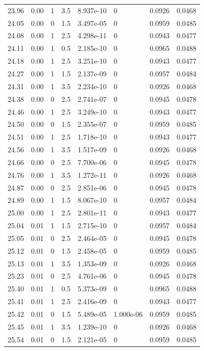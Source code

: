 \documentclass[preview]{standalone}
\begin{document}
{{{{{{{{{{{\begin{tabular}{L{1.2cm}C{1.2cm} C{0.3cm}C{0.5cm} C{1.4cm}C{1.4cm} C{1.4cm}C{1.4cm}}
  23.96  &  0.00  & 1     & 3.5 &  8.937e-10  & 0  & 0.0926 &  0.0468   \\ 
  24.05  &  0.00  & 0     & 1.5 &  3.497e-05  & 0  & 0.0959 &  0.0485   \\ 
  24.08  &  0.00  & 1     & 2.5 &  4.298e-11  & 0  & 0.0943 &  0.0477   \\ 
  24.11  &  0.00  & 1     & 0.5 &  2.185e-10  & 0  & 0.0965 &  0.0488   \\ 
  24.18  &  0.00  & 1     & 2.5 &  3.251e-10  & 0  & 0.0943 &  0.0477   \\ 
  24.27  &  0.00  & 1     & 1.5 &  2.137e-09  & 0  & 0.0957 &  0.0484   \\ 
  24.31  &  0.00  & 1     & 3.5 &  2.234e-10  & 0  & 0.0926 &  0.0468   \\ 
  24.38  &  0.00  & 0     & 2.5 &  2.741e-07  & 0  & 0.0945 &  0.0478   \\ 
  24.46  &  0.00  & 1     & 2.5 &  3.249e-10  & 0  & 0.0943 &  0.0477   \\ 
  24.50  &  0.00  & 0     & 1.5 &  2.355e-07  & 0  & 0.0959 &  0.0485   \\ 
  24.51  &  0.00  & 1     & 2.5 &  1.718e-10  & 0  & 0.0943 &  0.0477   \\ 
  24.56  &  0.00  & 1     & 3.5 &  1.517e-09  & 0  & 0.0926 &  0.0468   \\ 
  24.66  &  0.00  & 0     & 2.5 &  7.700e-06  & 0  & 0.0945 &  0.0478   \\ 
  24.76  &  0.00  & 1     & 3.5 &  1.272e-11  & 0  & 0.0926 &  0.0468   \\ 
  24.87  &  0.00  & 0     & 2.5 &  2.851e-06  & 0  & 0.0945 &  0.0478   \\ 
  24.89  &  0.00  & 1     & 1.5 &  8.067e-10  & 0  & 0.0957 &  0.0484   \\ 
  25.00  &  0.00  & 1     & 2.5 &  2.801e-11  & 0  & 0.0943 &  0.0477   \\ 
  25.04  &  0.01  & 1     & 1.5 &  2.715e-10  & 0  & 0.0957 &  0.0484   \\ 
  25.05  &  0.01  & 0     & 2.5 &  2.464e-05  & 0  & 0.0945 &  0.0478   \\ 
  25.12  &  0.01  & 0     & 1.5 &  2.458e-05  & 0  & 0.0959 &  0.0485   \\ 
  25.13  &  0.01  & 1     & 3.5 &  1.353e-09  & 0  & 0.0926 &  0.0468   \\ 
  25.23  &  0.01  & 0     & 2.5 &  4.761e-06  & 0  & 0.0945 &  0.0478   \\ 
  25.40  &  0.01  & 1     & 0.5 &  5.373e-09  & 0  & 0.0965 &  0.0488   \\ 
  25.41  &  0.01  & 1     & 2.5 &  2.416e-09  & 0  & 0.0943 &  0.0477   \\ 
  25.42  &  0.01  & 0     & 1.5 &  5.489e-05  & 1.000e-06  & 0.0959 &  0.0485   \\ 
  25.45  &  0.01  & 1     & 3.5 &  1.239e-10  & 0  & 0.0926 &  0.0468   \\ 
  25.54  &  0.01  & 0     & 1.5 &  2.121e-05  & 0  & 0.0959 &  0.0485   \\ 
\hline 
\end{tabular} 

}}}}}}}}}}}
\end{document}

